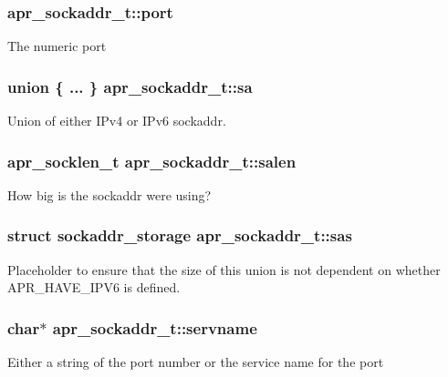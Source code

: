 \subsubsection[{\texorpdfstring{port}{port}}]{ apr\+\_\+sockaddr\+\_\+t\+::port}\hypertarget{structapr__sockaddr__t_a174c19138de9c208f13ed71b5892e505}{}\label{structapr__sockaddr__t_a174c19138de9c208f13ed71b5892e505}
The numeric port 
\subsubsection[{\texorpdfstring{sa}{sa}}]{\setlength{\rightskip}{0pt plus 5cm}union \{ ... \}   apr\+\_\+sockaddr\+\_\+t\+::sa}\hypertarget{structapr__sockaddr__t_a3ca40eae640100e0f157e7c21b33a17d}{}\label{structapr__sockaddr__t_a3ca40eae640100e0f157e7c21b33a17d}
Union of either I\+Pv4 or I\+Pv6 sockaddr. 
\subsubsection[{\texorpdfstring{salen}{salen}}]{\setlength{\rightskip}{0pt plus 5cm}apr\+\_\+socklen\+\_\+t apr\+\_\+sockaddr\+\_\+t\+::salen}\hypertarget{structapr__sockaddr__t_aef1d2a482f85eeab7b6bf0a7732a087a}{}\label{structapr__sockaddr__t_aef1d2a482f85eeab7b6bf0a7732a087a}
How big is the sockaddr we\textquotesingle{}re using? 
\subsubsection[{\texorpdfstring{sas}{sas}}]{\setlength{\rightskip}{0pt plus 5cm}struct sockaddr\+\_\+storage apr\+\_\+sockaddr\+\_\+t\+::sas}\hypertarget{structapr__sockaddr__t_ac823daa30be02ee1589b4b67615cef5f}{}\label{structapr__sockaddr__t_ac823daa30be02ee1589b4b67615cef5f}
Placeholder to ensure that the size of this union is not dependent on whether A\+P\+R\+\_\+\+H\+A\+V\+E\+\_\+\+I\+P\+V6 is defined. 
\subsubsection[{\texorpdfstring{servname}{servname}}]{\setlength{\rightskip}{0pt plus 5cm}char$\ast$ apr\+\_\+sockaddr\+\_\+t\+::servname}\hypertarget{structapr__sockaddr__t_a668335161a8347b9a34c600bff80b52f}{}\label{structapr__sockaddr__t_a668335161a8347b9a34c600bff80b52f}
Either a string of the port number or the service name for the port 
